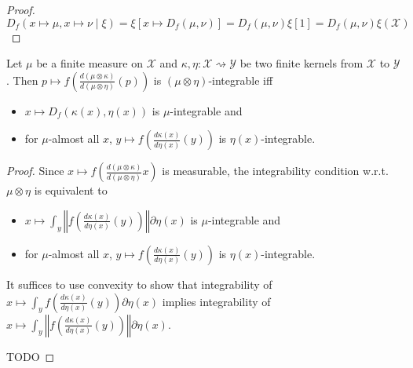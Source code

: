\begin{proof}\leanok
\uses{}
$$D_f(x \mapsto \mu, x \mapsto \nu \mid \xi) 
= \xi\left[x \mapsto D_f(\mu, \nu)\right] 
= D_f(\mu, \nu) \xi\left[1\right] 
= D_f(\mu, \nu) \xi (\mathcal X)$$
\end{proof}

\begin{lemma}
  \label{lem:integrable_fDiv_compProd_iff}
  \leanok
  Let $\mu$ be a finite measure on $\mathcal X$ and $\kappa, \eta : \mathcal X \rightsquigarrow \mathcal Y$ be two finite kernels from $\mathcal X$ to $\mathcal Y$.
  Then $p \mapsto f \left(\frac{d(\mu \otimes \kappa)}{d(\mu \otimes \eta)}(p)\right)$ is $(\mu \otimes \eta)$-integrable iff
  \begin{itemize}
    \item $x \mapsto D_f(\kappa(x), \eta(x))$ is $\mu$-integrable and
    \item for $\mu$-almost all $x$, $y \mapsto f \left( \frac{d\kappa(x)}{d\eta(x)}(y) \right)$ is $\eta(x)$-integrable. 
  \end{itemize}
\end{lemma}

\begin{proof}
Since $x \mapsto f \left(\frac{d(\mu \otimes \kappa)}{d(\mu \otimes \eta)} x \right)$ is measurable, the integrability condition w.r.t. $\mu \otimes \eta$ is equivalent to
\begin{itemize}
    \item $x \mapsto \int_y \left\Vert f \left( \frac{d\kappa(x)}{d\eta(x)}(y) \right) \right\Vert \partial \eta(x)$ is $\mu$-integrable and
    \item for $\mu$-almost all $x$, $y \mapsto f \left( \frac{d\kappa(x)}{d\eta(x)}(y) \right)$ is $\eta(x)$-integrable. 
  \end{itemize}
It suffices to use convexity to show that integrability of $x \mapsto \int_y f \left( \frac{d\kappa(x)}{d\eta(x)}(y) \right) \partial \eta(x)$ implies integrability of $x \mapsto \int_y \left\Vert f \left( \frac{d\kappa(x)}{d\eta(x)}(y) \right) \right\Vert \partial \eta(x)$.

TODO
\end{proof}

